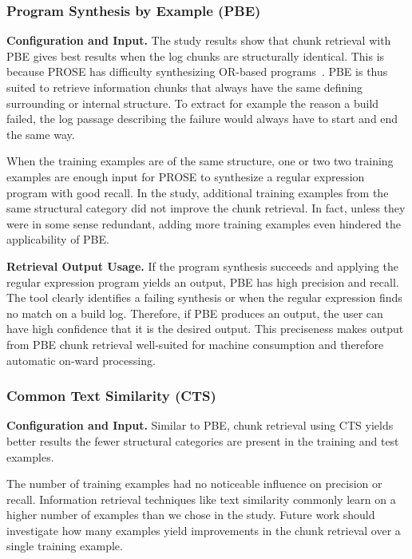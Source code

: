 \subsubsection{Program Synthesis by Example (PBE)}

\noindent
\textbf{Configuration and Input.}
The study results show that chunk retrieval with PBE gives best
results when the log chunks are structurally identical.
This is
because PROSE has difficulty synthesizing OR-based
programs~\cite{mayer2015user}.
PBE is thus suited to retrieve information
chunks that always have the same defining surrounding or internal
structure.
To extract for example the reason a build failed, the log
passage describing the failure would always have to start and
end the same way.

When the training examples are of the same structure, one or two
two training examples are enough input for PROSE to synthesize a regular
expression program with good recall.
In the study, additional training
examples from the same structural category
did not improve the chunk retrieval.
In fact, unless they
were in some sense redundant, adding more training examples even
hindered the applicability of PBE.

\noindent
\textbf{Retrieval Output Usage.}
If the program synthesis succeeds and applying the regular expression
program yields an output, PBE has high precision and recall.
The tool
clearly identifies a failing synthesis or when the regular expression
finds no match on a build log.
Therefore, if PBE produces
an output, the user can have high confidence that it is the desired
output.
This preciseness makes output from PBE chunk retrieval
well-suited for machine consumption and therefore automatic on-ward
processing.

\subsubsection{Common Text Similarity (CTS)}
\noindent
\textbf{Configuration and Input.}
Similar to PBE, chunk retrieval using CTS yields better results the
fewer structural categories are present in the training and test
examples.

The number of training examples had no noticeable influence on
precision or recall.
Information retrieval techniques
like text similarity commonly learn on a higher number of examples
than we chose in the study.
Future work should investigate how many
examples yield improvements in the chunk retrieval over a single
training example.

